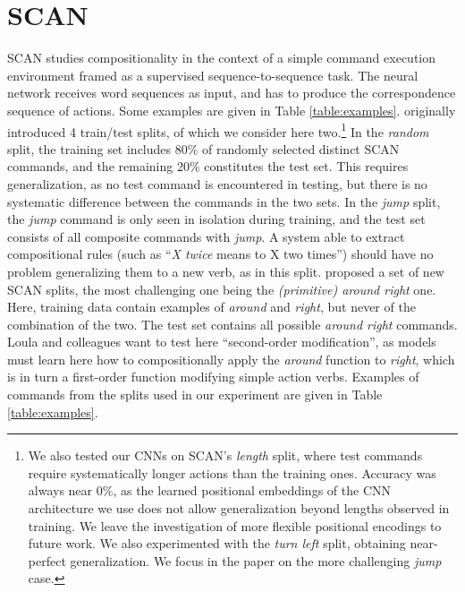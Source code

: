 \section{SCAN}
\label{sec:setup}

SCAN studies compositionality in the context of a simple command
execution environment framed as a supervised sequence-to-sequence
task. The neural network receives word sequences as input, and has to
produce the correspondence sequence of actions. Some examples are
given in Table \ref{table:examples}.
   originally introduced 4
train/test splits, of which we consider here two.\footnote{We also
  tested our CNNs on SCAN's \emph{length} split, where test commands
  require systematically longer actions than the training
  ones. Accuracy was always near 0\%, as the learned positional
  embeddings of the CNN architecture we use does not allow
  generalization beyond lengths observed in training. We leave the
  investigation of more flexible positional encodings \cite[as in,
  e.g.,][]{vaswani:etal:2017} to future work. We also experimented
  with the \emph{turn left} split, obtaining near-perfect
  generalization. We focus in the paper on the more challenging
  \emph{jump} case.} In the \emph{random} split, the training set
includes 80\% of randomly selected distinct SCAN commands, and the
remaining 20\% constitutes the test set. This requires generalization,
as no test command is encountered in testing, but there is no
systematic difference between the commands in the two sets.  In the
\emph{jump} split, the \emph{jump} command is only seen in isolation
during training, and the test set consists of all composite commands
with \emph{jump}. A system able to extract compositional rules (such
as ``\emph{X twice} means to X two times'') should have no problem
generalizing them to a new verb, as in this
split.  proposed a set of new SCAN splits,
the most challenging one being the \emph{(primitive) around right}
one.  Here, training data contain examples of \emph{around} and
\emph{right}, but never of the combination of the two. The test set
contains all possible \emph{around right} commands. Loula and
colleagues want to test here ``second-order modification'', as models
must learn here how to compositionally apply the \emph{around}
function to \emph{right}, which is in turn a first-order function
modifying simple action verbs. Examples of commands from the splits
used in our experiment are given in Table \ref{table:examples}.

